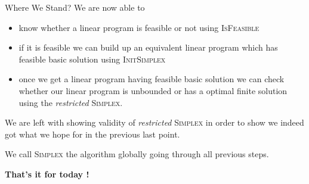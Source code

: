 \documentclass[32pt, aspectratio = 169]{beamer}
\begin{document}
\begin{frame}{Where We Stand?}
    We are now able to
    \begin{itemize}
        \item know whether a linear program is feasible or not using \textsc{IsFeasible}
        \item if it is feasible we can build up an equivalent linear program which has feasible basic solution using \textsc{InitSimplex}
        \item once we get a linear program having feasible basic solution we can check whether our linear program is unbounded or has a  optimal finite solution using the \textit{restricted} \textsc{Simplex}.
    \end{itemize}
    We are left with showing validity of \textit{restricted} \textsc{Simplex} in order to show we indeed got what we hope for in the previous last point.
    \begin{tcolorbox}[
        enhanced,
        parbox = false,
        colback = mLightBrown!30!white,
        colframe = mLightBrown!30!white,
        arc = 0mm,
        ]
        We call \textsc{Simplex} the algorithm globally going through all previous steps.
    \end{tcolorbox}
\end{frame}

\begin{frame}
        \centering
        {\huge \textbf{That's it for today !}}
\end{frame}
\end{document}
